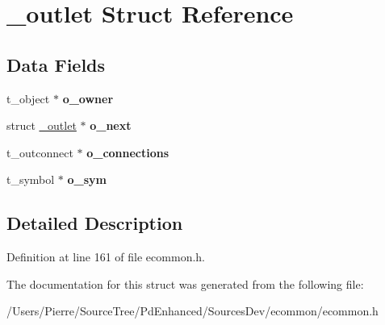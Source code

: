 \hypertarget{struct__outlet}{\section{\-\_\-outlet Struct Reference}
\label{struct__outlet}
}
\subsection*{Data Fields}
\begin{DoxyCompactItemize}
\item 
\hypertarget{struct__outlet_a7bdd65bdf46102a176835f19b3a2305b}{t\-\_\-object $\ast$ {\bfseries o\-\_\-owner}}\label{struct__outlet_a7bdd65bdf46102a176835f19b3a2305b}

\item 
\hypertarget{struct__outlet_ae26edec286a8bef11baa15ac0b9480e8}{struct \hyperlink{struct__outlet}{\-\_\-outlet} $\ast$ {\bfseries o\-\_\-next}}\label{struct__outlet_ae26edec286a8bef11baa15ac0b9480e8}

\item 
\hypertarget{struct__outlet_a18a291d6dfc4d4f5c380381138774af4}{t\-\_\-outconnect $\ast$ {\bfseries o\-\_\-connections}}\label{struct__outlet_a18a291d6dfc4d4f5c380381138774af4}

\item 
\hypertarget{struct__outlet_a305d36ab508da845dc8909a4b8570f9a}{t\-\_\-symbol $\ast$ {\bfseries o\-\_\-sym}}\label{struct__outlet_a305d36ab508da845dc8909a4b8570f9a}

\end{DoxyCompactItemize}


\subsection{Detailed Description}


Definition at line 161 of file ecommon.\-h.



The documentation for this struct was generated from the following file\-:\begin{DoxyCompactItemize}
\item 
/\-Users/\-Pierre/\-Source\-Tree/\-Pd\-Enhanced/\-Sources\-Dev/ecommon/ecommon.\-h\end{DoxyCompactItemize}

